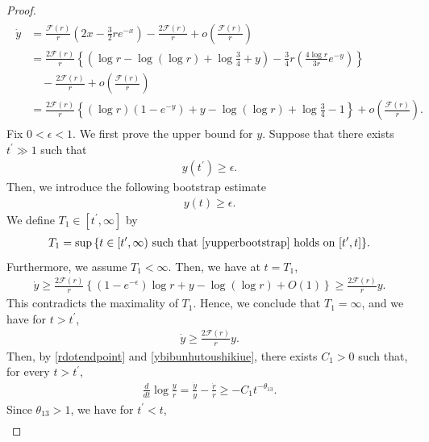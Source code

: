 \documentclass[reqno]{amsart}
\theoremstyle{plain}
\theoremstyle{definition}
\numberwithin{equation}{section}
\begin{document}
\begin{proof}
\begin{align}\label{ydotendpoint}
\begin{aligned}
\dot{y}&=\frac{\mathcal{F}(r)}{r}\left(2x-\frac{3}{2}re^{-x}\right)-\frac{2\mathcal{F}(r)}{r}+o\left(\frac{\mathcal{F}(r)}{r}\right)
\\
&=\frac{2\mathcal{F}(r)}{r}\left\{\left(\log{r}-\log{(\log{r})}+\log{\frac{3}{4}}+y\right)-\frac{3}{4}r\left(\frac{4\log{r}}{3r}e^{-y}\right) \right\}
\\
&\quad-\frac{2\mathcal{F}(r)}{r}+o\left(\frac{\mathcal{F}(r)}{r}\right)
\\
&=\frac{2\mathcal{F}(r)}{r}\left\{\left(\log{r}\right)\left(1-e^{-y}\right)+y-\log{(\log{r})}+\log{\frac{3}{4}}-1\right\}+o\left(\frac{\mathcal{F}(r)}{r}\right).
\end{aligned}
\end{align}
Fix $0<\epsilon<1$. We first prove the upper bound for $y$. Suppose
that there exists $t^{\prime}\gg1$ such that
\begin{align*}
y(t^{\prime})\geq\epsilon.
\end{align*}
Then, we introduce the following bootstrap estimate
\begin{align}\label{yupperbootstrap}
y(t)\geq \epsilon.
\end{align}
We define $T_1\in [t^{\prime},\infty]$ by
\begin{align}\label{yupperexit}
T_1=\sup{\{t\in[t^{\prime},\infty)\ \mbox{such that}\ \eqref{yupperbootstrap}\ \mbox{holds on}\ [t^{\prime},t] \}}.
\end{align}
Furthermore, we assume $T_1<\infty$. Then, we have at $t=T_1$,
\begin{align*}
\dot{y}\geq\frac{2\mathcal{F}(r)}{r}\left\{\left(1-e^{-\epsilon}\right)\log r+y-\log(\log r)+O(1)\right\}\geq\frac{2\mathcal{F}(r)}{r}y.
\end{align*}
This contradicts the maximality of $T_1$. Hence, we conclude that $T_1=\infty$, and we have for $t>t^{\prime}$,
\begin{align}\label{ybibunhutoushikiue}
\dot{y}\geq\frac{2\mathcal{F}(r)}{r}y.
\end{align}
Then, by \eqref{rdotendpoint} and \eqref{ybibunhutoushikiue}, there exists $C_1>0$ such that, for every $t>t^{\prime}$,
\begin{align*}
\frac{d}{dt}\log\frac{y}{r}=\frac{\dot{y}}{y}-\frac{\dot{r}}{r}\geq-C_1t^{-\theta_{13}}.
\end{align*}
Since $\theta_{13}>1$, we have for $t^{\prime}<t$,
\begin{align*}

\end{align*}
\end{proof}
\end{document}
